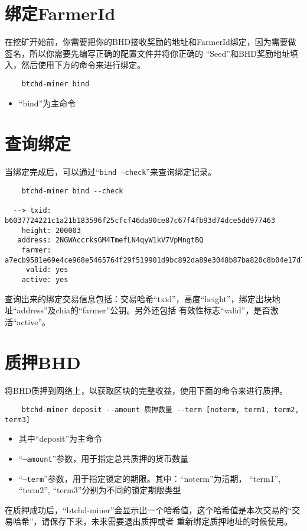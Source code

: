 \section{绑定FarmerId}
\begin{flushleft}
    在挖矿开始前，你需要把你的BHD接收奖励的地址和FarmerId绑定，因为需要做签名，所以你需要先编写正确的配置文件并将你正确的
    ``Seed''和BHD奖励地址填入，然后使用下方的命令来进行绑定。
\end{flushleft}
\scriptsize
\begin{verbatim}
    btchd-miner bind
\end{verbatim}
\normalsize
\begin{itemize}
    \item ``bind''为主命令
\end{itemize}
\section{查询绑定}
\begin{flushleft}
    当绑定完成后，可以通过``\texttt{bind --check}''来查询绑定记录。
\end{flushleft}
\scriptsize
\begin{verbatim}
    btchd-miner bind --check

  --> txid: b6037724221c1a21b183596f25cfcf46da90ce87c67f4fb93d74dce5dd977463
    height: 200003
   address: 2NGWAccrksGM4TmefLN4qyW1kV7VpMngtBQ
    farmer: a7ecb9581e69e4ce968e5465764f29f519901d9bc892da89e3048b87ba820c8b04e17d726bfbb236e3f0e33f8a83851e
     valid: yes
    active: yes
\end{verbatim}
\normalsize
\begin{flushleft}
    查询出来的绑定交易信息包括：交易哈希``txid''，高度``height''，绑定出块地址``address''及chia的``farmer''公钥。另外还包括
    有效性标志``valid''，是否激活``active''。
\end{flushleft}
\section{质押BHD}
\begin{flushleft}
    将BHD质押到网络上，以获取区块的完整收益，使用下面的命令来进行质押。
\end{flushleft}
\scriptsize
\begin{verbatim}
    btchd-miner deposit --amount 质押数量 --term [noterm, term1, term2, term3]
\end{verbatim}
\normalsize
\begin{itemize}
    \item 其中``deposit''为主命令
    \item ``\texttt{--amount}''参数，用于指定总共质押的货币数量
    \item ``\texttt{--term}''参数，用于指定锁定的期限。其中：``noterm''为活期， ``term1'', ``term2'', ``term3''分别为不同的锁定期限类型
\end{itemize}
\begin{flushleft}
    在质押成功后，``btchd-miner''会显示出一个哈希值，这个哈希值是本次交易的``交易哈希''，请保存下来，未来需要退出质押或者
    重新绑定质押地址的时候使用。
\end{flushleft}
